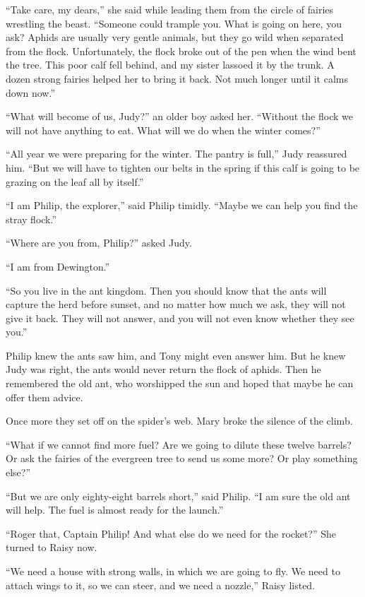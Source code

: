 \documentclass[10pt, draft]{memoir}
\begin{document}
``Take care, my dears,'' she said while leading them from the circle of fairies
wrestling the beast. ``Someone could trample you. What is going on here, you
ask? Aphids are usually very gentle animals, but they go wild when separated
from the flock. Unfortunately, the flock broke out of the pen when the wind
bent the tree. This poor calf fell behind, and my sister lassoed it by the
trunk. A dozen strong fairies helped her to bring it back. Not much longer
until it calms down now.'' 

``What will become of us, Judy?'' an older boy asked her. ``Without the flock
we will not  have anything to eat. What will we do when the winter comes?''

``All year we were preparing for the winter. The pantry is full,'' Judy
reassured him. ``But we will have to tighten our belts in the spring if this
calf is going to be grazing on the leaf all by itself.''

``I am Philip, the explorer,'' said Philip timidly. ``Maybe we can help you
find the stray flock.''

``Where are you from, Philip?'' asked Judy.

``I am from Dewington.''

``So you live in the ant kingdom. Then you should know that the ants will
capture the herd before sunset, and no matter how much we ask, they will not
give it back. They will not answer, and you will not even know whether they see
you.''

Philip knew the ants saw him, and Tony might even answer him. But he knew Judy
was right, the ants would never return the flock of aphids. Then he remembered
the old ant, who worshipped the sun and hoped that maybe he can offer them
advice.

Once more they set off on the spider's web. Mary broke the silence of the
climb.

``What if we cannot find more fuel? Are we going to dilute these twelve
barrels? Or ask the fairies of the evergreen tree to send us some more? Or play
something else?''

``But we are only eighty-eight barrels short,'' said Philip. ``I am sure the
old ant will help. The fuel is almost ready for the launch.''

``Roger that, Captain Philip! And what else do we need for the rocket?'' She
turned to Raisy now.

``We need a house with strong walls, in which we are going to fly. We need to
attach wings to it, so we can steer, and we need a nozzle,'' Raisy listed.
\end{document}
